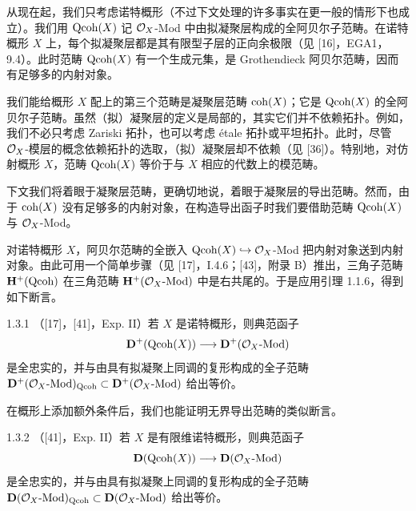 从现在起，我们只考虑诺特概形（不过下文处理的许多事实在更一般的情形下也成立）。我们用 $\mathrm{Qcoh}(X)$ 记 $\mathcal{O}_X$-Mod 中由拟凝聚层构成的全阿贝尔子范畴。在诺特概形 $X$ 上，每个拟凝聚层都是其有限型子层的正向余极限（见 [16]，EGA1，9.4）。此时范畴 $\mathrm{Qcoh}(X)$ 有一个生成元集，是 Grothendieck 阿贝尔范畴，因而有足够多的内射对象。

我们能给概形 $X$ 配上的第三个范畴是凝聚层范畴 $\mathrm{coh}(X)$；它是 $\mathrm{Qcoh}(X)$ 的全阿贝尔子范畴。虽然（拟）凝聚层的定义是局部的，其实它们并不依赖拓扑。例如，我们不必只考虑 Zariski 拓扑，也可以考虑 étale 拓扑或平坦拓扑。此时，尽管 $\mathcal{O}_X$-模层的概念依赖拓扑的选取，（拟）凝聚层却不依赖（见 [36]）。特别地，对仿射概形 $X$，范畴 $\mathrm{Qcoh}(X)$ 等价于与 $X$ 相应的代数上的模范畴。


下文我们将着眼于凝聚层范畴，更确切地说，着眼于凝聚层的导出范畴。然而，由于 $\mathrm{coh}(X)$ 没有足够多的内射对象，在构造导出函子时我们要借助范畴 $\mathrm{Qcoh}(X)$ 与 $\mathcal{O}_X$-Mod。

对诺特概形 $X$，阿贝尔范畴的全嵌入 $\mathrm{Qcoh}(X)\hookrightarrow\mathcal{O}_X$-Mod 把内射对象送到内射对象。由此可用一个简单步骤（见 [17]，I.4.6；[43]，附录 B）推出，三角子范畴 $\mathbf{H}^{+}(\mathrm{Qcoh})$ 在三角范畴 $\mathbf{H}^{+}(\mathcal{O}_X\text{-}\mathrm{Mod})$ 中是右共尾的。于是应用引理 1.1.6，得到如下断言。

\begin{proposition}{1.3.1}
（[17]，[41]，Exp. II）若 $X$ 是诺特概形，则典范函子
\begin{equation*}
\mathbf{D}^{+}(\mathrm{Qcoh}(X))\longrightarrow\mathbf{D}^{+}(\mathcal{O}_X\text{-}\mathrm{Mod})
\end{equation*}
是全忠实的，并与由具有拟凝聚上同调的复形构成的全子范畴 $\mathbf{D}^{+}(\mathcal{O}_X\text{-}\mathrm{Mod})_{\mathrm{Qcoh}}\subset\mathbf{D}^{+}(\mathcal{O}_X\text{-}\mathrm{Mod})$ 给出等价。
\end{proposition}

在概形上添加额外条件后，我们也能证明无界导出范畴的类似断言。

\begin{proposition}{1.3.2}
（[41]，Exp. II）若 $X$ 是有限维诺特概形，则典范函子
\begin{equation*}
\mathbf{D}(\mathrm{Qcoh}(X))\longrightarrow\mathbf{D}(\mathcal{O}_X\text{-}\mathrm{Mod})
\end{equation*}
是全忠实的，并与由具有拟凝聚上同调的复形构成的全子范畴 $\mathbf{D}(\mathcal{O}_X\text{-}\mathrm{Mod})_{\mathrm{Qcoh}}\subset\mathbf{D}(\mathcal{O}_X\text{-}\mathrm{Mod})$ 给出等价。
\end{proposition}

